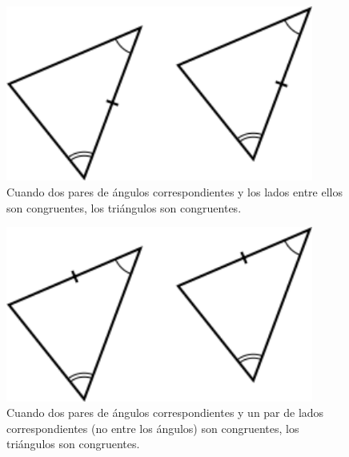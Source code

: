 \begin{tcolorbox}[
        colbacktitle=gray!20,
        fonttitle=\bfseries,
        coltitle=black,
        colframe=colorrds!35!white,
        center title,
        adjusted title={Criterios de congruencia}]
\begin{tcbitemize}
        \tcbitem[title={Ángulo Lado Ángulo (ALA)}]
        \begin{figure}[H]
            \centering
            \includegraphics[width=0.9\textwidth]{../images/criterioALA}
            \caption{Cuando dos pares de ángulos correspondientes y los lados entre ellos son congruentes, los triángulos son congruentes.}
            \label{fig:criterioALA}
        \end{figure}

        \tcbitem[title={Ángulo Ángulo Lado (AAL)}]
        \begin{figure}[H]
            \centering
            \includegraphics[width=0.9\textwidth]{../images/criterioAAL}
            \caption{Cuando dos pares de ángulos correspondientes y un par de lados correspondientes (no entre los ángulos) son congruentes, los triángulos son congruentes.}
            \label{fig:criterioAAL}
        \end{figure}
    \end{tcbitemize}
\end{tcolorbox}